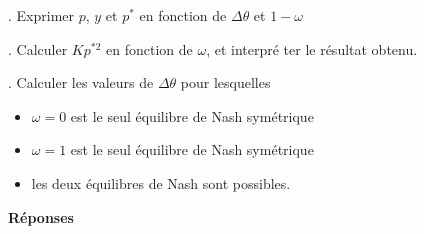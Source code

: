 \documentclass[11pt,a4paper]{article}
\begin{document}
\bigskip


. Exprimer $p$, $y$ et $p^{\ast }$ en fonction de $\Delta \theta$ et $%
1-\omega $

\bigskip

. Calculer $Kp^{\ast 2}$ en fonction de $\omega $, et interpr\'{e}%
ter le r\'{e}sultat obtenu.

\bigskip

. Calculer les valeurs de $\Delta \theta $ pour lesquelles

\begin{itemize}
\item $\omega =0$ est le seul \'{e}quilibre de Nash sym\'{e}trique

\item $\omega =1$ est le seul \'{e}quilibre de Nash sym\'{e}trique

\item les deux \'{e}quilibres de Nash sont possibles.
\end{itemize}

\newpage


\textbf{R\'{e}ponses}
\end{document}

